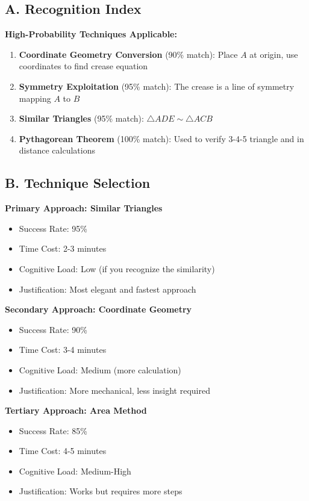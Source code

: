 \documentclass[12pt]{article}
\begin{document}
\begin{conversionbox}
\subsection*{A. Recognition Index}

\textbf{High-Probability Techniques Applicable:}
\begin{enumerate}
    \item \textbf{Coordinate Geometry Conversion} (90\% match): Place $A$ at origin, use coordinates to find crease equation
    \item \textbf{Symmetry Exploitation} (95\% match): The crease is a line of symmetry mapping $A$ to $B$
    \item \textbf{Similar Triangles} (95\% match): $\triangle ADE \sim \triangle ACB$
    \item \textbf{Pythagorean Theorem} (100\% match): Used to verify 3-4-5 triangle and in distance calculations
\end{enumerate}

\subsection*{B. Technique Selection}

\textbf{Primary Approach: Similar Triangles}
\begin{itemize}
    \item Success Rate: 95\%
    \item Time Cost: 2-3 minutes
    \item Cognitive Load: Low (if you recognize the similarity)
    \item Justification: Most elegant and fastest approach
\end{itemize}

\textbf{Secondary Approach: Coordinate Geometry}
\begin{itemize}
    \item Success Rate: 90\%
    \item Time Cost: 3-4 minutes
    \item Cognitive Load: Medium (more calculation)
    \item Justification: More mechanical, less insight required
\end{itemize}

\textbf{Tertiary Approach: Area Method}
\begin{itemize}
    \item Success Rate: 85\%
    \item Time Cost: 4-5 minutes
    \item Cognitive Load: Medium-High
    \item Justification: Works but requires more steps
\end{itemize}


\end{conversionbox}
\end{document}
